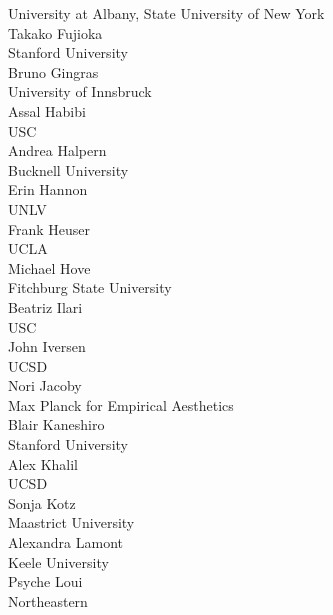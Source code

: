 \begin{multicols}{2}
\vspace{.5em}University at Albany, State University of New York\\
Takako Fujioka\\
\vspace{.5em}Stanford University\\
Bruno Gingras\\
\vspace{.5em}University of Innsbruck\\
Assal Habibi\\
\vspace{.5em}USC\\
Andrea Halpern\\
\vspace{.5em}Bucknell University\\
Erin Hannon\\
\vspace{.5em}UNLV\\
Frank Heuser\\
\vspace{.5em}UCLA\\
Michael Hove\\
\vspace{.5em}Fitchburg State University\\
Beatriz Ilari\\
\vspace{.5em}USC\\
John Iversen\\
\vspace{.5em}UCSD\\
Nori Jacoby\\
\vspace{.5em}Max Planck for Empirical Aesthetics\\
Blair Kaneshiro\\
\vspace{.5em}Stanford University\\
Alex Khalil\\
\vspace{.5em}UCSD\\
Sonja Kotz\\
\vspace{.5em}Maastrict University\\
Alexandra Lamont\\
\vspace{.5em}Keele University\\
Psyche Loui\\
\vspace{.5em}Northeastern\\

\end{multicols}
